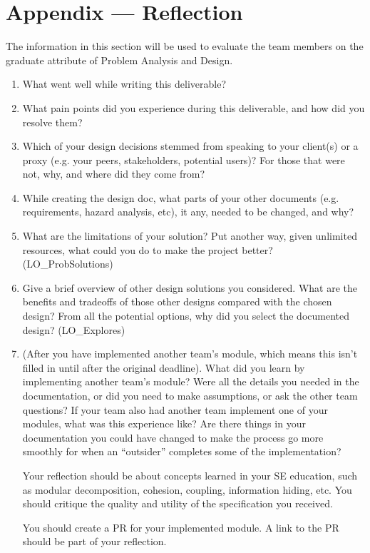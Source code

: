 \documentclass[12pt, titlepage]{article}
\begin{document}
\newpage{}

\section{Appendix --- Reflection}


The information in this section will be used to evaluate the team members on the
graduate attribute of Problem Analysis and Design.



\begin{enumerate}
  \item What went well while writing this deliverable? 
  \item What pain points did you experience during this deliverable, and how
    did you resolve them?
  \item Which of your design decisions stemmed from speaking to your client(s)
  or a proxy (e.g. your peers, stakeholders, potential users)? For those that
  were not, why, and where did they come from?
  \item While creating the design doc, what parts of your other documents (e.g.
  requirements, hazard analysis, etc), it any, needed to be changed, and why?
  \item What are the limitations of your solution?  Put another way, given
  unlimited resources, what could you do to make the project better? (LO\_ProbSolutions)
  \item Give a brief overview of other design solutions you considered.  What
  are the benefits and tradeoffs of those other designs compared with the chosen
  design?  From all the potential options, why did you select the documented design?
  (LO\_Explores)
  \item (After you have implemented another team's module, which means this
  isn't filled in until after the original deadline). What did you learn by
  implementing another team's module? Were all the details you needed in the
  documentation, or did you need to make assumptions, or ask the other team
  questions?  If your team also had another team implement one of your modules,
  what was this experience like?  Are there things in your documentation you
  could have changed to make the process go more smoothly for when an
  ``outsider'' completes some of the implementation?

  Your reflection should be about concepts learned in your SE education, such as modular decomposition, cohesion, coupling, information hiding, etc.  You should critique the quality and utility of the specification you received.

  You should create a PR for your implemented module.  A link to the PR should be part of your reflection.

\end{enumerate}
\end{document}
